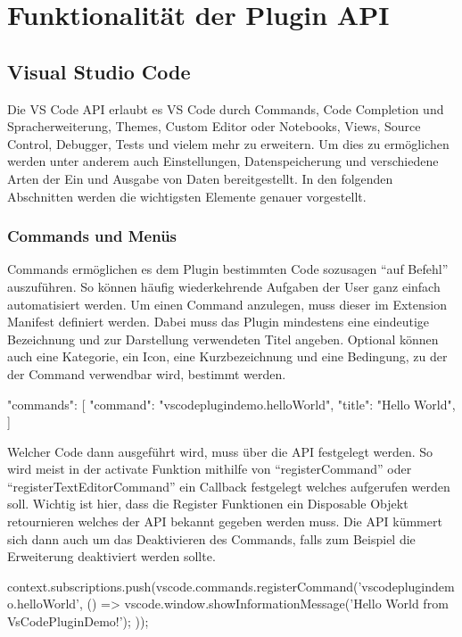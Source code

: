 \section{Funktionalität der Plugin API}
\label{sec:FunktionalitätDerPluginAPI}

\subsection{Visual Studio Code}

Die VS Code API erlaubt es VS Code durch Commands, Code Completion und Spracherweiterung, 
Themes, Custom Editor oder Notebooks, Views, Source Control, Debugger, Tests und vielem mehr zu
erweitern. Um dies zu ermöglichen werden unter anderem auch Einstellungen, Datenspeicherung
und verschiedene Arten der Ein und Ausgabe von Daten bereitgestellt. In den folgenden Abschnitten
werden die wichtigsten Elemente genauer vorgestellt.

\subsubsection{Commands und Menüs}
  Commands ermöglichen es dem Plugin bestimmten Code sozusagen \enquote{auf Befehl} auszuführen.
  So können häufig wiederkehrende Aufgaben der User ganz einfach automatisiert werden.
  Um einen Command anzulegen, muss dieser im Extension Manifest definiert werden. Dabei muss
  das Plugin mindestens eine eindeutige Bezeichnung und zur Darstellung verwendeten Titel angeben.
  Optional können auch eine Kategorie, ein Icon, eine Kurzbezeichnung und eine Bedingung, 
  zu der der Command verwendbar wird, bestimmt werden.
  \begin{JsCode}
    "commands": [
      {
        "command": "vscodeplugindemo.helloWorld",
        "title": "Hello World",
      }
    ]
  \end{JsCode}

  Welcher Code dann ausgeführt wird, muss über die API festgelegt werden. So wird meist
  in der activate Funktion mithilfe von \enquote{registerCommand} oder \enquote{registerTextEditorCommand} %
  ein Callback festgelegt welches aufgerufen werden soll. Wichtig ist hier, dass
  die Register Funktionen ein Disposable Objekt retournieren welches der API bekannt gegeben werden
  muss. Die API kümmert sich dann auch um das Deaktivieren des Commands, falls zum Beispiel
  die Erweiterung deaktiviert werden sollte.
  \begin{JsCode}
    context.subscriptions.push(vscode.commands.registerCommand('vscodeplugindemo.helloWorld', () => {
      vscode.window.showInformationMessage('Hello World from VsCodePluginDemo!');
    }));
  \end{JsCode}

